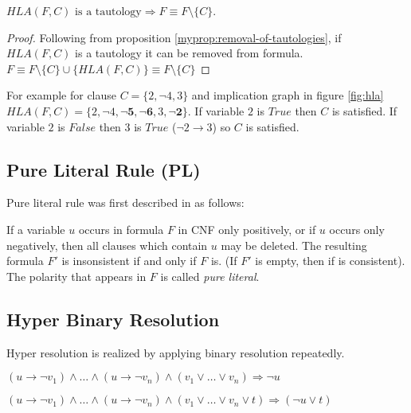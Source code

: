 \begin{myprop}[HTE]
  $HLA(F, C) \text{ is a tautology} \Rightarrow F \equiv F \setminus \{C\}$.
\end{myprop}

\begin{proof}
  Following from proposition \ref{myprop:removal-of-tautologies},
  if $HLA(F, C)$ is a tautology it can be removed from formula.
  $F \equiv F \setminus \{C\} \cup \{HLA(F, C)\} \equiv F \setminus \{C\}$
\end{proof}

For example for clause $C = \{ 2, \neg 4, 3\}$ and implication graph
in figure \ref{fig:hla} $HLA(F, C) = \{2, \neg 4, \mathbf{\neg 5,
\neg 6}, 3, \mathbf{\neg 2} \}$.  If variable $2$ is $True$ then
$C$ is satisfied. If variable $2$ is $False$ then $3$ is $True$
($\neg 2 \rightarrow 3$) so $C$ is satisfied.


\subsection{Pure Literal Rule (PL)}
\label{ssec:pl}

Pure literal rule was first described in \cite{Davis:1960:CPQ:321033.321034}
as follows:

\begin{mydef}
  If a variable $u$ occurs in formula $F$ in CNF only positively, or
  if $u$ occurs only negatively, then all clauses which contain $u$
  may be deleted. The resulting formula $F'$ is insonsistent
  if and only if $F$ is. (If $F'$ is empty, then if is consistent).
  The polarity that appears in $F$ is called \emph{pure literal}.
\end{mydef}


\subsection{Hyper Binary Resolution}
\label{ssec:hbr}

Hyper resolution is realized by applying binary resolution repeatedly.


\begin{myprop}
  $(u \rightarrow \neg v_1) \land \ldots
  \land (u \rightarrow \neg v_n) \land (v_1 \lor \dots \lor v_n)
  \Rightarrow \neg u$
\end{myprop}

\begin{myprop}
  $(u \rightarrow \neg v_1) \land \ldots
  \land (u \rightarrow \neg v_n)
  \land (v_1 \lor \dots \lor v_n \lor t) \Rightarrow (\neg u \lor t)$
\end{myprop}

